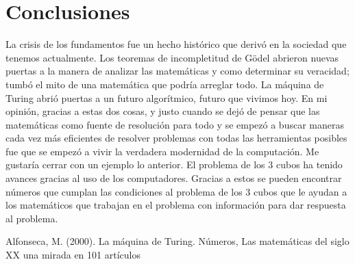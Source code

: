 \documentclass[12pt]{article}
\begin{document}
\section {Conclusiones}
La crisis de los fundamentos fue un hecho histórico que derivó en la sociedad que tenemos actualmente. 
\newline
Los teoremas de incompletitud de Gödel abrieron nuevas puertas a la manera de analizar las matemáticas y como determinar su veracidad; tumbó el mito de una matemática que podría arreglar todo.
\newline
La máquina de Turing abrió puertas a un futuro algorítmico, futuro que vivimos hoy.
\newline
En mi opinión, gracias a estas dos cosas, y justo cuando se dejó de pensar que las matemáticas como fuente de resolución para todo y se empezó a buscar maneras cada vez más eficientes de resolver problemas con todas las herramientas posibles fue que se empezó a vivir la verdadera modernidad de la computación.
\newline
Me gustaría cerrar con un ejemplo lo anterior.
\newline
El problema de los 3 cubos ha tenido avances gracias al uso de los computadores. Gracias a estos se pueden encontrar números que cumplan las condiciones al problema de los 3 cubos que le ayudan a los matemáticos que trabajan en el problema con información para dar respuesta al problema.
\begin{thebibliography}{1}
 Alfonseca, M. (2000). La máquina de Turing. Números, Las matemáticas del siglo XX una mirada en 101 artículos
\end{thebibliography}
\end{document}
